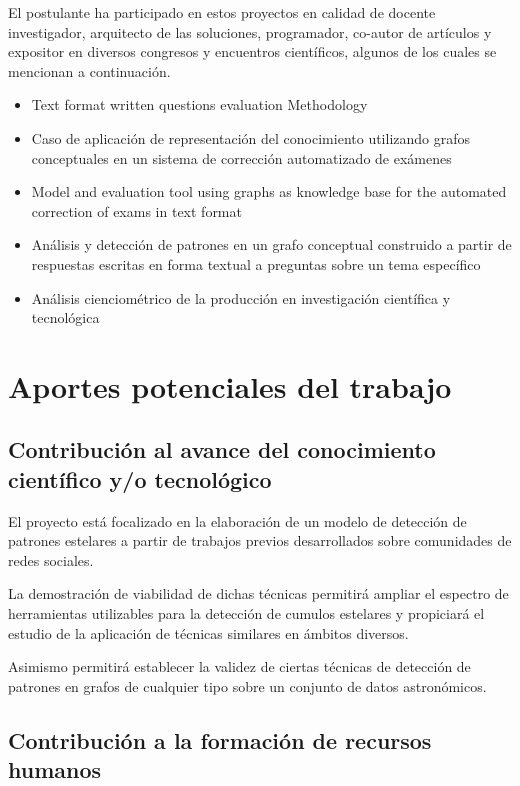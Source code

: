 \documentclass[
	11pt,oneside,a4paper,
	headsepline,footsepline,
	fleqn,
]{memoir}
\begin{document}
El postulante ha participado en estos proyectos en calidad de docente investigador, arquitecto de las soluciones, programador, co-autor de artículos y expositor en diversos congresos y encuentros científicos, algunos de los cuales se mencionan a continuación.

\begin{itemize}
	\item Text format written questions evaluation Methodology\cite{Menvielle2016}
	\item Caso de aplicación de representación del conocimiento utilizando grafos conceptuales en un sistema de corrección automatizado de exámenes\cite{PazMenvielle2017}
	\item Model and evaluation tool using graphs as knowledge base for the automated correction of exams in text format\cite{Menvielle2017}
	\item Análisis y detección de patrones en un grafo conceptual construido a partir de respuestas escritas en forma textual a preguntas sobre un tema específico\cite{PazMenvielle2018}
	\item Análisis cienciométrico de la producción en investigación científica y tecnológica\cite{Munoz2020}
\end{itemize}

\section{Aportes potenciales del trabajo}

\subsection{Contribución al avance del conocimiento científico y/o tecnológico}

El proyecto está focalizado en la elaboración de un modelo de detección de patrones estelares a partir de trabajos previos desarrollados sobre comunidades de redes sociales.

La demostración de viabilidad de dichas técnicas permitirá ampliar el espectro de herramientas utilizables para la detección de cumulos estelares y propiciará el estudio de la aplicación de técnicas similares en ámbitos diversos.

Asimismo permitirá establecer la validez de ciertas técnicas de detección de patrones en grafos de cualquier tipo sobre un conjunto de datos astronómicos.

\subsection{Contribución a la formación de recursos humanos}
\end{document}
